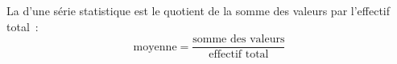 La  d'une série statistique est le quotient de la somme
des valeurs par l'effectif total~:
$$\text{moyenne}=\dfrac{\text{somme des valeurs}}{\text{effectif total}}$$